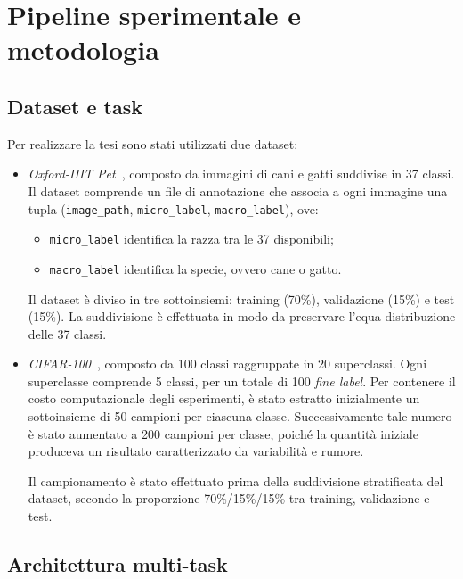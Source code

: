 \chapter{Pipeline sperimentale e metodologia}

\section{Dataset e task}

Per realizzare la tesi sono stati utilizzati due dataset:

\begin{itemize}
	\item \emph{Oxford-IIIT Pet}~\cite{parkhi12a}, composto da immagini di cani e gatti suddivise in 37 classi.
	      Il dataset comprende un file di annotazione che associa a ogni immagine una tupla
	      (\texttt{image\_path}, \texttt{micro\_label}, \texttt{macro\_label}), ove:

	      \begin{itemize}
		      \item \texttt{micro\_label} identifica la razza tra le 37 disponibili;
		      \item \texttt{macro\_label} identifica la specie, ovvero cane o gatto.
	      \end{itemize}

	      Il dataset è diviso in tre sottoinsiemi: training (70\%), validazione (15\%) e test (15\%).
	      La suddivisione è effettuata in modo da preservare l'equa distribuzione delle 37 classi.
	\item \emph{CIFAR-100}~\cite{krizhevsky2009learning}, composto da 100 classi raggruppate in 20 superclassi.
	      Ogni superclasse comprende 5 classi, per un totale di 100 \textit{fine label}. Per contenere il costo
	      computazionale degli esperimenti, è stato estratto inizialmente un sottoinsieme di 50 campioni per ciascuna classe.
	      Successivamente tale numero è stato aumentato a 200 campioni per classe, poiché la quantità iniziale produceva un risultato
	      caratterizzato da variabilità e rumore.

	      Il campionamento è stato effettuato prima della suddivisione stratificata del dataset, secondo la proporzione 70\%/15\%/15\% tra training, validazione e test.
\end{itemize}

\section{Architettura multi-task}
\label{chapter:3.2}

